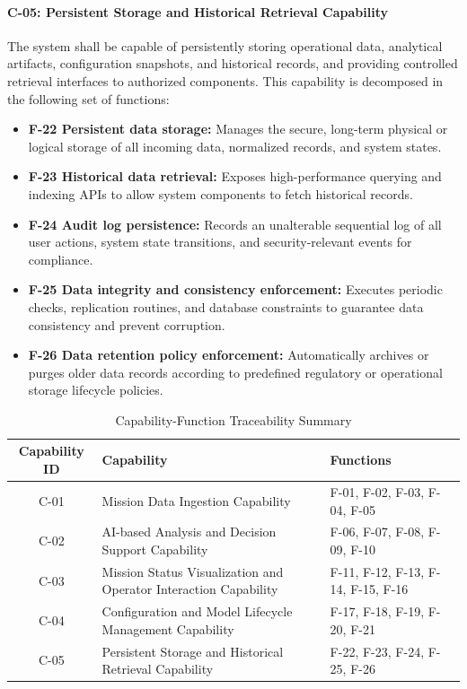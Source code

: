 \paragraph{C-05: Persistent Storage and Historical Retrieval Capability}
The system shall be capable of persistently storing operational data, analytical artifacts, configuration snapshots, and historical records, and providing controlled retrieval interfaces to authorized components. This capability is decomposed in the following set of functions:
\begin{itemize}
    \item \textbf{F-22 Persistent data storage:} Manages the secure, long-term physical or logical storage of all incoming data, normalized records, and system states.
    \item \textbf{F-23 Historical data retrieval:} Exposes high-performance querying and indexing APIs to allow system components to fetch historical records.
    \item \textbf{F-24 Audit log persistence:} Records an unalterable sequential log of all user actions, system state transitions, and security-relevant events for compliance.
    \item \textbf{F-25 Data integrity and consistency enforcement:} Executes periodic checks, replication routines, and database constraints to guarantee data consistency and prevent corruption.
    \item \textbf{F-26 Data retention policy enforcement:} Automatically archives or purges older data records according to predefined regulatory or operational storage lifecycle policies.
\end{itemize}


\begin{table}[htbp]
    \centering
    \caption{Capability-Function Traceability Summary}
    \label{tab:function_allocation}
    \begin{tabular}{|c|p{7cm}|p{4.5cm}|}
        \hline
        \textbf{Capability ID} & \textbf{Capability} & \textbf{Functions} \\ \hline
        C-01 & Mission Data Ingestion Capability & F-01, F-02, F-03, F-04, F-05 \\ \hline
        C-02 & AI-based Analysis and Decision Support Capability & F-06, F-07, F-08, F-09, F-10 \\ \hline
        C-03 & Mission Status Visualization and Operator Interaction Capability & F-11, F-12, F-13, F-14, F-15, F-16 \\ \hline
        C-04 & Configuration and Model Lifecycle Management Capability & F-17, F-18, F-19, F-20, F-21 \\ \hline
        C-05 & Persistent Storage and Historical Retrieval Capability & F-22, F-23, F-24, F-25, F-26 \\ \hline
    \end{tabular}
\end{table}




